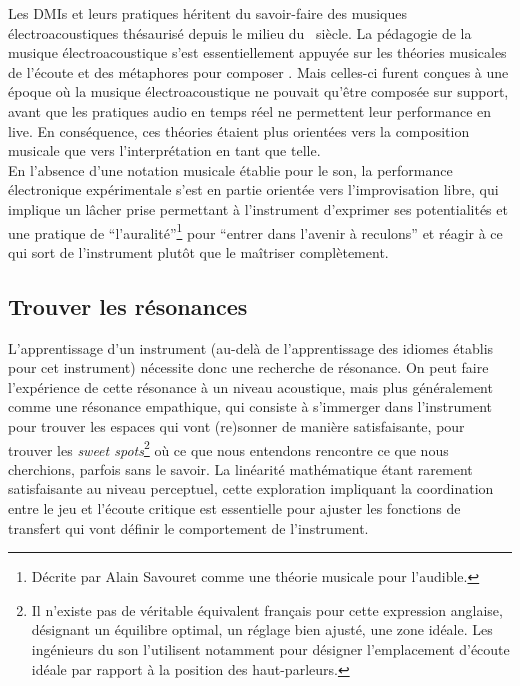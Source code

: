 \noindent Les \glspl{DMI} et leurs pratiques héritent du savoir-faire des musiques électroacoustiques thésaurisé depuis le milieu du ~siècle. La pédagogie de la musique électroacoustique s'est essentiellement appuyée sur les théories musicales de l'écoute \cite{schaeffer_traite_1966} et des métaphores pour composer \cite{bayle_musique_1993}. Mais celles-ci furent conçues à une époque où la musique électroacoustique ne pouvait qu'être composée sur support, avant que les pratiques audio en temps réel ne permettent leur performance en live. En conséquence, ces théories étaient plus orientées vers la composition musicale que vers l'interprétation en tant que telle.\\
\indent En l'absence d'une notation musicale établie pour le son, la performance électronique expérimentale s'est en partie orientée vers l'improvisation libre, qui implique un lâcher prise permettant à l'instrument d'exprimer ses potentialités et une pratique de ``l'auralité''\footnote{Décrite par Alain Savouret comme une théorie musicale pour l'audible.} pour ``entrer dans l'avenir à reculons'' \cite{savouret_introduction_2010} et réagir à ce qui sort de l'instrument plutôt que le maîtriser complètement. 

\subsection{Trouver les résonances}

\noindent L'apprentissage d'un instrument (au-delà de l'apprentissage des idiomes établis pour cet instrument) nécessite donc une recherche de résonance. On peut faire l'expérience de cette résonance à un niveau acoustique, mais plus généralement comme une résonance empathique, qui consiste à s'immerger dans l'instrument pour trouver les espaces qui vont (re)sonner de manière satisfaisante, pour trouver les \textit{sweet spots}\footnote{Il n'existe pas de véritable équivalent français pour cette expression anglaise, désignant un équilibre optimal, un réglage bien ajusté, une zone idéale. Les ingénieurs du son l'utilisent notamment pour désigner l'emplacement d'écoute idéale par rapport à la position des haut-parleurs.} où ce que nous entendons rencontre ce que nous cherchions, parfois sans le savoir. La linéarité mathématique étant rarement satisfaisante au niveau perceptuel, cette exploration impliquant la coordination entre le jeu et l'écoute critique est essentielle pour ajuster les fonctions de transfert qui vont définir le comportement de l'instrument.

